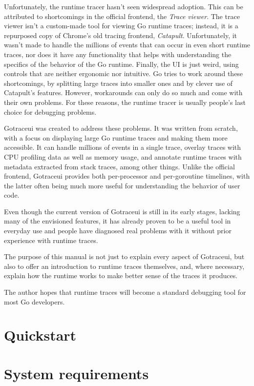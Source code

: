 \documentclass[10pt,letterpaper,oneside,openany,showtrims,draft]{memoir}
\begin{document}
Unfortunately, the runtime tracer hasn't seen widespread adoption.
This can be attributed to shortcomings in the official frontend, the \emph{Trace viewer}.
The trace viewer isn't a custom-made tool for viewing Go runtime traces;
instead, it is a repurposed copy of Chrome's old tracing frontend, \emph{Catapult}.
Unfortunately, it wasn't made to handle the millions of events that can occur in even short runtime traces,
nor does it have any functionality that helps with understanding the specifics of the behavior of the Go runtime.
Finally, the UI is just weird, using controls that are neither ergonomic nor intuitive.
Go tries to work around these shortcomings, by splitting large traces into smaller ones and by clever use of Catapult's features.
However, workarounds can only do so much and come with their own problems.
For these reasons, the runtime tracer is usually people's last choice for debugging problems.

Gotraceui was created to address these problems.
It was written from scratch, with a focus on displaying large Go runtime traces and making them more accessible.
It can handle millions of events in a single trace, overlay traces with CPU profiling data as well as memory usage,
and annotate runtime traces with metadata extracted from stack traces, among other things.
Unlike the official frontend, Gotraceui provides both per-processor and per-goroutine timelines,
with the latter often being much more useful for understanding the behavior of user code.

Even though the current version of Gotraceui is still in its early stages,
lacking many of the envisioned features,
it has already proven to be a useful tool in everyday use
and people have diagnosed real problems with it without prior experience with runtime traces.

The purpose of this manual is not just to explain every aspect of Gotraceui,
but also to offer an introduction to runtime traces themselves,
and, where necessary, explain how the runtime works to make better sense of the traces it produces.

The author hopes that runtime traces will become a standard debugging tool for most Go developers.

\chapter{Quickstart}

\chapter{System requirements}
\end{document}

